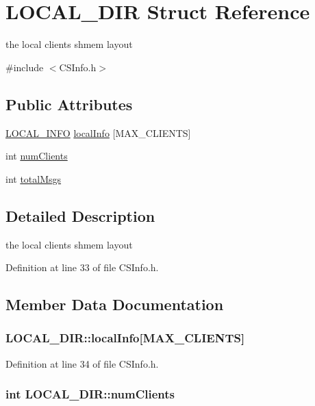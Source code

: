 \hypertarget{structLOCAL__DIR}{
\section{LOCAL\_\-DIR Struct Reference}
\label{structLOCAL__DIR}
}


the local clients shmem layout  


{\ttfamily \#include $<$CSInfo.h$>$}\subsection*{Public Attributes}
\begin{DoxyCompactItemize}
\item 
\hyperlink{structLOCAL__INFO}{LOCAL\_\-INFO} \hyperlink{structLOCAL__DIR_aa3e290065fd7020e89357bb0864b6225}{localInfo} \mbox{[}MAX\_\-CLIENTS\mbox{]}
\item 
int \hyperlink{structLOCAL__DIR_ab3d38050e1b1595a2d7722b3429a71ef}{numClients}
\item 
int \hyperlink{structLOCAL__DIR_a7b6fc663de7fb68253bbff3496243d99}{totalMsgs}
\end{DoxyCompactItemize}


\subsection{Detailed Description}
the local clients shmem layout 

Definition at line 33 of file CSInfo.h.

\subsection{Member Data Documentation}
\hypertarget{structLOCAL__DIR_aa3e290065fd7020e89357bb0864b6225}{
\subsubsection[{localInfo}]{ {\bf LOCAL\_\-DIR::localInfo}\mbox{[}MAX\_\-CLIENTS\mbox{]}}}
\label{structLOCAL__DIR_aa3e290065fd7020e89357bb0864b6225}


Definition at line 34 of file CSInfo.h.\hypertarget{structLOCAL__DIR_ab3d38050e1b1595a2d7722b3429a71ef}{
\subsubsection[{numClients}]{\setlength{\rightskip}{0pt plus 5cm}int {\bf LOCAL\_\-DIR::numClients}}}
\label{structLOCAL__DIR_ab3d38050e1b1595a2d7722b3429a71ef}


